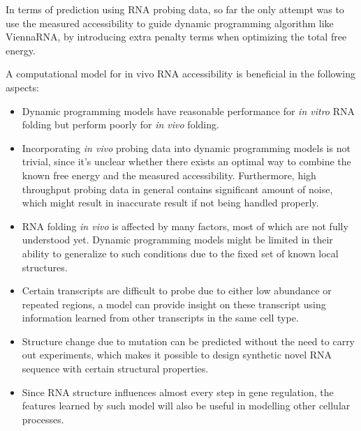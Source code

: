 \documentclass{proposal}
\begin{document}
In terms of prediction using RNA probing data,
so far the only attempt was to use the measured accessibility to guide dynamic programming algorithm like ViennaRNA\cite{lorenz2011viennarna},
by introducing extra penalty terms when optimizing the total free energy.

A computational model for in vivo RNA accessibility is beneficial in the following aspects:

\begin{itemize}
    \item Dynamic programming models have reasonable performance for \textit{in vitro} RNA folding but perform poorly for \textit{in vivo} folding.
    \item Incorporating \textit{in vivo} probing data into dynamic programming models is not trivial,
    since it's unclear whether there exists an optimal way to combine the known free energy and the measured accessibility.
    Furthermore, high throughput probing data in general contains significant amount of noise,
    which might result in inaccurate result if not being handled properly.
    \item RNA folding \textit{in vivo} is affected by many factors, most of which are not fully understood yet.
    Dynamic programming models might be limited in their ability to generalize to such conditions
    due to the fixed set of known local structures.
    \item Certain transcripts are difficult to probe due to either low abundance or repeated regions,
        a model can provide insight on these transcript using information learned from other transcripts in the same cell type.
    \item Structure change due to mutation can be predicted without the need to carry out experiments,
        which makes it possible to design synthetic novel RNA sequence with certain structural properties.
    \item Since RNA structure influences almost every step in gene regulation,
        the features learned by such model will also be useful in modelling other cellular processes.
\end{itemize}
\end{document}
